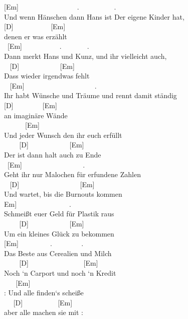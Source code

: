\documentclass[
  letterpaper,
]{scrbook}
\begin{document}
{[}Em{]} ~ ~ ~ ~ ~ ~ ~ ~ ~ ~. ~ ~ ~ ~ ~ ~. ~\\
Und wenn Hänschen dann Hans ist Der eigene Kinder hat,\\
{[}D{]} ~ ~ ~ ~ ~ ~ {[}Em{]}\\
denen er was erzählt\\
\hspace*{0.333em} ~{[}Em{]} ~ ~ ~ ~ ~ ~ . ~ ~ ~ ~ .\\
Dann merkt Hans und Kunz, und ihr vielleicht auch,\\
\hspace*{0.333em} ~ {[}D{]} ~ ~ ~ ~ ~ ~ ~{[}Em{]}\\
Dass wieder irgendwas fehlt\\
\hspace*{0.333em} ~ {[}Em{]} ~ ~ ~ ~ ~ ~ ~ ~ ~ ~ ~ ~.\\
Ihr habt Wünsche und Träume und rennt damit ständig\\
{[}D{]} ~ ~ ~ ~ ~{[}Em{]}\\
an imaginäre Wände\\
\hspace*{0.333em} ~ ~ ~ ~{[}Em{]}\\
Und jeder Wunsch den ihr euch erfüllt\\
\hspace*{0.333em} ~ ~ ~{[}D{]} ~ ~ ~ ~ ~ ~ ~{[}Em{]}\\
Der ist dann halt auch zu Ende\\
\hspace*{0.333em} ~{[}Em{]} ~ ~ ~ ~ ~ ~ ~ ~ ~ ~ .\\
Geht ihr nur Malochen für erfundene Zahlen\\
\hspace*{0.333em} ~ {[}D{]} ~ ~ ~ ~ ~ ~ ~ ~ ~ ~ {[}Em{]}\\
Und wartet, bis die Burnouts kommen\\
\hspace*{0.333em}{[}Em{]} ~ ~ ~ ~ ~ ~ ~ ~ ~.\\
Schmeißt euer Geld für Plastik raus\\
\hspace*{0.333em} ~ ~ ~{[}D{]} ~ ~ ~ ~ ~ ~ ~{[}Em{]}\\
Um ein kleines Glück zu bekommen\\
\hspace*{0.333em} {[}Em{]} ~ ~ ~ ~ ~ . ~ ~ ~ ~ ~.\\
Das Beste aus Cerealien und Milch\\
\hspace*{0.333em} ~ ~ ~{[}D{]} ~ ~ ~ ~ ~ ~ ~ ~ ~ {[}Em{]}\\
Noch `n Carport und noch `n Kredit\\
\hspace*{0.333em} ~ ~ {[}Em{]}\\
\textbar: Und alle finden`s scheiße ~ ~ ~ ~\\
\hspace*{0.333em} ~ ~{[}D{]} ~ ~ ~ ~ ~ ~{[}Em{]}\\
aber alle machen sie mit :\textbar{} ~ ~ ~ ~
\end{document}
